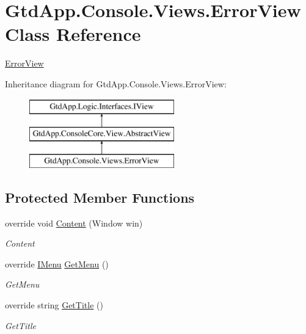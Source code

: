 \hypertarget{class_gtd_app_1_1_console_1_1_views_1_1_error_view}{}\section{Gtd\+App.\+Console.\+Views.\+Error\+View Class Reference}
\label{class_gtd_app_1_1_console_1_1_views_1_1_error_view}


\mbox{\hyperlink{class_gtd_app_1_1_console_1_1_views_1_1_error_view}{Error\+View}}  


Inheritance diagram for Gtd\+App.\+Console.\+Views.\+Error\+View\+:\begin{figure}[H]
\begin{center}
\leavevmode
\includegraphics[height=3.000000cm]{class_gtd_app_1_1_console_1_1_views_1_1_error_view}
\end{center}
\end{figure}
\subsection*{Protected Member Functions}
\begin{DoxyCompactItemize}
\item 
override void \mbox{\hyperlink{class_gtd_app_1_1_console_1_1_views_1_1_error_view_a0d228bc1e760ed818a207e7399011839}{Content}} (Window win)
\begin{DoxyCompactList}\small\item\em Content \end{DoxyCompactList}\item 
override \mbox{\hyperlink{interface_gtd_app_1_1_console_core_1_1_menu_1_1_i_menu}{I\+Menu}} \mbox{\hyperlink{class_gtd_app_1_1_console_1_1_views_1_1_error_view_a6073e05c80db775ba86986c8a068df87}{Get\+Menu}} ()
\begin{DoxyCompactList}\small\item\em Get\+Menu \end{DoxyCompactList}\item 
override string \mbox{\hyperlink{class_gtd_app_1_1_console_1_1_views_1_1_error_view_a877430d97de101a08a4d0894ccaf41c0}{Get\+Title}} ()
\begin{DoxyCompactList}\small\item\em Get\+Title \end{DoxyCompactList}\end{DoxyCompactItemize}
